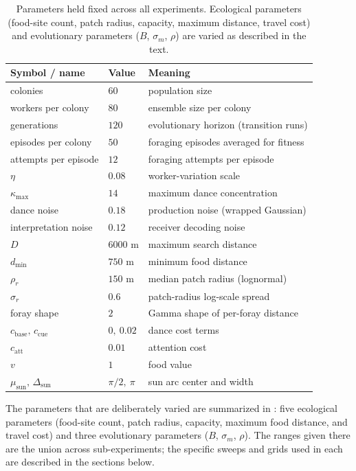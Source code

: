 \begin{table}
  \centering
  \begin{tabular}{lll}
    \toprule
    Symbol / name & Value & Meaning \\
    \midrule
    colonies & $60$ & population size \\
    workers per colony & $80$ & ensemble size per colony \\
    generations & $120$ & evolutionary horizon (transition runs) \\
    episodes per colony & $50$ & foraging episodes averaged for fitness \\
    attempts per episode & $12$ & foraging attempts per episode \\
    $\eta$ & $0.08$ & worker-variation scale \\
    $\kappa_{\max}$ & $14$ & maximum dance concentration \\
    dance noise & $0.18$ & production noise (wrapped Gaussian) \\
    interpretation noise & $0.12$ & receiver decoding noise \\
    $D$ & $6000$ m & maximum search distance \\
    $d_{\min}$ & $750$ m & minimum food distance \\
    $\rho_r$ & $150$ m & median patch radius (lognormal) \\
    $\sigma_r$ & $0.6$ & patch-radius log-scale spread \\
    foray shape & $2$ & Gamma shape of per-foray distance \\
    $c_{\mathrm{base}},\,c_{\mathrm{cue}}$ & $0,\ 0.02$ & dance cost terms \\
    $c_{\mathrm{att}}$ & $0.01$ & attention cost \\
    $v$ & $1$ & food value \\
    $\mu_{\mathrm{sun}},\,\Delta_{\mathrm{sun}}$ & $\pi/2,\ \pi$ & sun arc center and width \\
    \bottomrule
  \end{tabular}
  \caption{Parameters held fixed across all experiments. Ecological parameters
    (food-site count, patch radius, capacity, maximum distance, travel cost) and
    evolutionary parameters ($B$, $\sigma_m$, $\rho$) are varied as described in
    the text.}
  \label{tab:fixed-params}
\end{table}

The parameters that are deliberately varied are summarized in
: five ecological parameters (food-site count, patch
radius, capacity, maximum food distance, and travel cost) and three evolutionary
parameters ($B$, $\sigma_m$, $\rho$). The ranges given there are the union across
sub-experiments; the specific sweeps and grids used in each are described in the
sections below.

